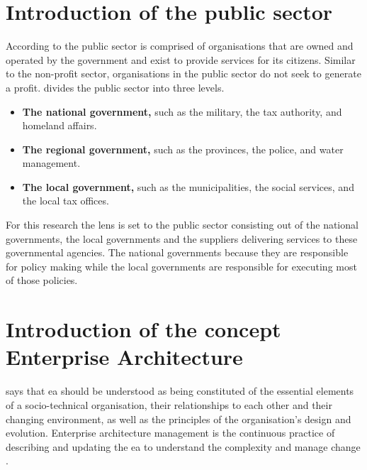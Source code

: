\section{Introduction of the public sector}
\label{sec:intropublicsector}
According to \textcite{PrivacySense2016} the public sector is comprised of organisations that are owned and operated by the government and exist to provide services for its citizens. Similar to the non-profit sector, organisations in the public sector do not seek to generate a profit. \textcite{PrivacySense2016} divides the public sector into three levels.
\begin{itemize}
	\item{\textbf{The national government,} such as the military, the tax authority, and homeland affairs.}
	\item{\textbf{The regional government,} such as the provinces, the police, and water management.}
	\item{\textbf{The local government,} such as the municipalities, the social services, and the local tax offices.}
\end{itemize}
For this research the lens is set to the public sector consisting out of the national governments, the local governments and the suppliers delivering services to these governmental agencies. The national governments because they are responsible for policy making while the local governments are responsible for executing most of those policies.
\section{Introduction of the concept Enterprise Architecture}
\label{sec:introea}
\textcite[p.~104]{Lapalme2016} says that \acrfull{ea} should be understood as being constituted of the essential elements of a socio-technical organisation, their relationships to each other and their changing environment, as well as the principles of the organisation’s design and evolution. Enterprise architecture management is the continuous practice of describing and updating the \acrshort{ea} to understand the complexity and manage change \parencite{Lapalme2016}. 
